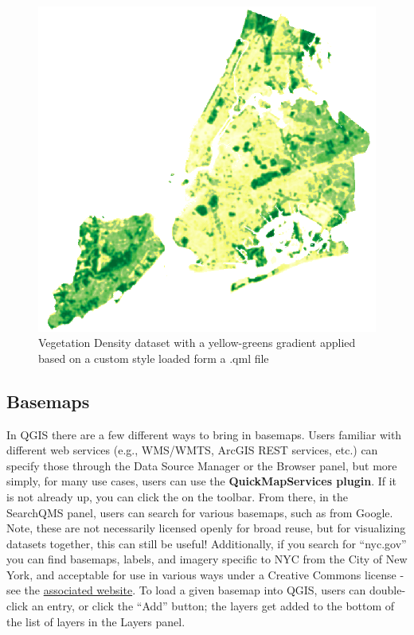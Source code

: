 \documentclass[
  letterpaper,
  DIV=11,
  numbers=noendperiod]{scrreprt}
\begin{document}
\begin{figure}

{\centering \includegraphics{./images/vegetation_density_custom.png}

}

\caption{Vegetation Density dataset with a yellow-greens gradient
applied based on a custom style loaded form a .qml file}

\end{figure}

\hypertarget{basemaps}{%
\subsection{Basemaps}\label{basemaps}}

In QGIS there are a few different ways to bring in basemaps. Users
familiar with different web services (e.g., WMS/WMTS, ArcGIS REST
services, etc.) can specify those through the Data Source Manager or the
Browser panel, but more simply, for many use cases, users can use the
\textbf{QuickMapServices plugin}. If it is not already up, you can click
the  on the toolbar.
From there, in the SearchQMS panel, users can search for various
basemaps, such as from Google. Note, these are not necessarily licensed
openly for broad reuse, but for visualizing datasets together, this can
still be useful! Additionally, if you search for ``nyc.gov'' you can
find basemaps, labels, and imagery specific to NYC from the City of New
York, and acceptable for use in various ways under a Creative Commons
license - see the \href{https://maps.nyc.gov/tiles/}{associated
website}. To load a given basemap into QGIS, users can double-click an
entry, or click the ``Add'' button; the layers get added to the bottom
of the list of layers in the Layers panel.
\end{document}
